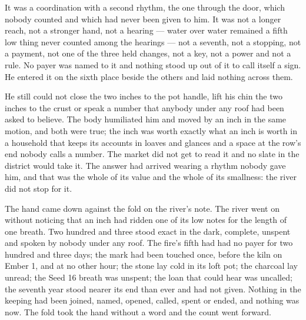 It was a coordination with a second rhythm, the one through the door, which nobody counted and which had never been given to him. It was not a longer reach, not a stronger hand, not a hearing --- water over water remained a fifth low thing never counted among the hearings --- not a seventh, not a stopping, not a payment, not one of the three held changes, not a key, not a power and not a rule. No payer was named to it and nothing stood up out of it to call itself a sign. He entered it on the sixth place beside the others and laid nothing across them.

He still could not close the two inches to the pot handle, lift his chin the two inches to the crust or speak a number that anybody under any roof had been asked to believe. The body humiliated him and moved by an inch in the same motion, and both were true; the inch was worth exactly what an inch is worth in a household that keeps its accounts in loaves and glances and a space at the row's end nobody calls a number. The market did not get to read it and no slate in the district would take it. The answer had arrived wearing a rhythm nobody gave him, and that was the whole of its value and the whole of its smallness: the river did not stop for it.

The hand came down against the fold on the river's note. The river went on without noticing that an inch had ridden one of its low notes for the length of one breath. Two hundred and three stood exact in the dark, complete, unspent and spoken by nobody under any roof. The fire's fifth had had no payer for two hundred and three days; the mark had been touched once, before the kiln on Ember 1, and at no other hour; the stone lay cold in its loft pot; the charcoal lay unread; the Seed 16 breath was unspent; the loan that could hear was uncalled; the seventh year stood nearer its end than ever and had not given. Nothing in the keeping had been joined, named, opened, called, spent or ended, and nothing was now. The fold took the hand without a word and the count went forward.
